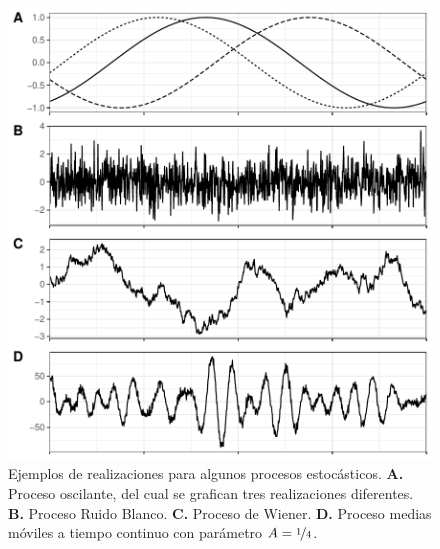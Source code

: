 \documentclass[12pt,letterpaper]{book}
\begin{document}
\begin{figure}
\centering
\includegraphics[width=\linewidth]{./img_mas_ejemplos/ruidos_ejemplos.pdf}
\caption[Ejemplos de procesos estocásticos.]{Ejemplos de realizaciones para algunos procesos estocásticos. \textbf{A.} Proceso oscilante, del cual se grafican tres realizaciones diferentes. \textbf{B.} Proceso Ruido Blanco. \textbf{C.} Proceso de Wiener. \textbf{D.} Proceso medias móviles a tiempo continuo con parámetro $A=\nicefrac{1}{4}$.}
\end{figure}

\end{document}
